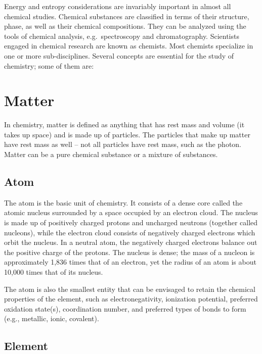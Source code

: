 \documentclass[
]{book}
\begin{document}
Energy and entropy considerations are invariably important in almost all chemical studies. Chemical substances are classified in terms of their structure, phase, as well as their chemical compositions. They can be analyzed using the tools of chemical analysis, e.g.~spectroscopy and chromatography. Scientists engaged in chemical research are known as chemists. Most chemists specialize in one or more sub-disciplines. Several concepts are essential for the study of chemistry; some of them are:

\hypertarget{matter}{%
\section{Matter}\label{matter}}

In chemistry, matter is defined as anything that has rest mass and volume (it takes up space) and is made up of particles. The particles that make up matter have rest mass as well -- not all particles have rest mass, such as the photon. Matter can be a pure chemical substance or a mixture of substances.

\hypertarget{atom}{%
\subsection{Atom}\label{atom}}

The atom is the basic unit of chemistry. It consists of a dense core called the atomic nucleus surrounded by a space occupied by an electron cloud. The nucleus is made up of positively charged protons and uncharged neutrons (together called nucleons), while the electron cloud consists of negatively charged electrons which orbit the nucleus. In a neutral atom, the negatively charged electrons balance out the positive charge of the protons. The nucleus is dense; the mass of a nucleon is approximately 1,836 times that of an electron, yet the radius of an atom is about 10,000 times that of its nucleus.

The atom is also the smallest entity that can be envisaged to retain the chemical properties of the element, such as electronegativity, ionization potential, preferred oxidation state(s), coordination number, and preferred types of bonds to form (e.g., metallic, ionic, covalent).

\hypertarget{element}{%
\subsection{Element}\label{element}}
\end{document}
